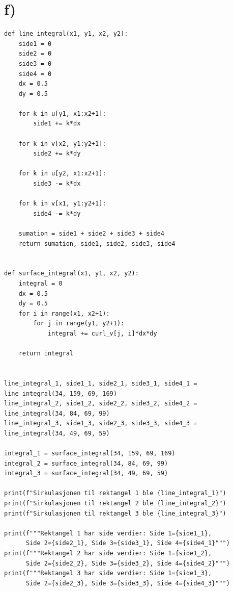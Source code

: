 \documentclass[a4paper,10pt,norsk]{article}
\begin{document}
	\section*{f)}\label{ass:f}
\begin{lstlisting}
def line_integral(x1, y1, x2, y2):
    side1 = 0
    side2 = 0
    side3 = 0
    side4 = 0
    dx = 0.5
    dy = 0.5

    for k in u[y1, x1:x2+1]:
        side1 += k*dx

    for k in v[x2, y1:y2+1]:
        side2 += k*dy

    for k in u[y2, x1:x2+1]:
        side3 -= k*dx

    for k in v[x1, y1:y2+1]:
        side4 -= k*dy

    sumation = side1 + side2 + side3 + side4
    return sumation, side1, side2, side3, side4


def surface_integral(x1, y1, x2, y2):
    integral = 0
    dx = 0.5
    dy = 0.5
    for i in range(x1, x2+1):
        for j in range(y1, y2+1):
            integral += curl_v[j, i]*dx*dy

    return integral


line_integral_1, side1_1, side2_1, side3_1, side4_1 = line_integral(34, 159, 69, 169)
line_integral_2, side1_2, side2_2, side3_2, side4_2 = line_integral(34, 84, 69, 99)
line_integral_3, side1_3, side2_3, side3_3, side4_3 = line_integral(34, 49, 69, 59)

integral_1 = surface_integral(34, 159, 69, 169)
integral_2 = surface_integral(34, 84, 69, 99)
integral_3 = surface_integral(34, 49, 69, 59)

print(f"Sirkulasjonen til rektangel 1 ble {line_integral_1}")
print(f"Sirkulasjonen til rektangel 2 ble {line_integral_2}")
print(f"Sirkulasjonen til rektangel 3 ble {line_integral_3}")

print(f"""Rektangel 1 har side verdier: Side 1={side1_1},
      Side 2={side2_1}, Side 3={side3_1}, Side 4={side4_1}""")
print(f"""Rektangel 2 har side verdier: Side 1={side1_2},
      Side 2={side2_2}, Side 3={side3_2}, Side 4={side4_2}""")
print(f"""Rektangel 3 har side verdier: Side 1={side1_3},
      Side 2={side2_3}, Side 3={side3_3}, Side 4={side4_3}""")
\end{lstlisting}
\end{document}
